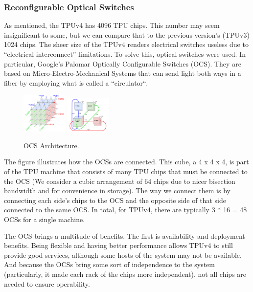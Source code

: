 \subsubsection{Reconfigurable Optical Switches}
As mentioned, the TPUv4 has 4096 TPU chips.
This number may seem insignificant to some, but we can compare that to the previous version’s (TPUv3) 1024 chips.
The sheer size of the TPUv4 renders electrical switches useless due to “electrical interconnect” limitations.
To solve this, optical switches were used.
In particular, Google's Palomar Optically Configurable Switches (OCS).
They are based on Micro-Electro-Mechanical Systems that can send light both ways in a fiber by employing what is called a ``circulator``.

\begin{figure}[htbp!]
    \centerline{\includegraphics[width=0.2\textwidth]{images/tpu_cube}
    \includegraphics[width=0.2\textwidth]{images/tpu_connectivity}}
    \caption{OCS Architecture.}
    \label{fig:ocsarch}
\end{figure}

The figure illustrates how the OCSs are connected.
This cube, a 4 x 4 x 4, is part of the TPU machine that consists of many TPU chips that must be connected to the OCS (We consider a cubic arrangement of 64 chips due to nicer bisection bandwidth and for convenience in storage).
The way we connect them is by connecting each side’s chips to the OCS and the opposite side of that side connected to the same OCS\@.
In total, for TPUv4, there are typically 3 * 16 = 48 OCSs for a single machine.

The OCS brings a multitude of benefits.
The first is availability and deployment benefits.
Being flexible and having better performance allows TPUv4 to still provide good services, although some hosts of the system may not be available.
And because the OCSs bring some sort of independence to the system (particularly, it made each rack of the chips more independent), not all chips are needed to ensure operability.

